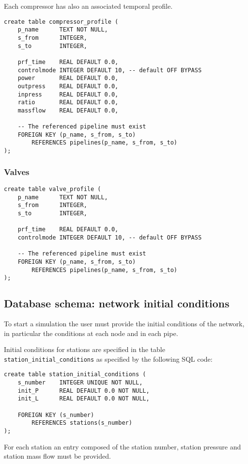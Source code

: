 Each compressor has also an associated temporal profile.
\begin{verbatim}
create table compressor_profile (
    p_name      TEXT NOT NULL,
    s_from      INTEGER,
    s_to        INTEGER,

    prf_time    REAL DEFAULT 0.0,
    controlmode INTEGER DEFAULT 10, -- default OFF BYPASS
    power       REAL DEFAULT 0.0,
    outpress    REAL DEFAULT 0.0,
    inpress     REAL DEFAULT 0.0,
    ratio       REAL DEFAULT 0.0,
    massflow    REAL DEFAULT 0.0,

    -- The referenced pipeline must exist
    FOREIGN KEY (p_name, s_from, s_to)
        REFERENCES pipelines(p_name, s_from, s_to)
);
\end{verbatim}


\subsubsection{Valves}
\begin{verbatim}
create table valve_profile (
    p_name      TEXT NOT NULL,
    s_from      INTEGER,
    s_to        INTEGER,

    prf_time    REAL DEFAULT 0.0,
    controlmode INTEGER DEFAULT 10, -- default OFF BYPASS

    -- The referenced pipeline must exist
    FOREIGN KEY (p_name, s_from, s_to)
        REFERENCES pipelines(p_name, s_from, s_to)
);
\end{verbatim}

\subsection{Database schema: network initial conditions}

To start a simulation the user must provide the initial conditions of the network,
in particular the conditions at each node and in each pipe.

Initial conditions for stations are specified in the table \texttt{station\_initial\_conditions}
as specified by the following SQL code:
\begin{verbatim}
create table station_initial_conditions (
    s_number    INTEGER UNIQUE NOT NULL,
    init_P      REAL DEFAULT 0.0 NOT NULL,
    init_L      REAL DEFAULT 0.0 NOT NULL,

    FOREIGN KEY (s_number)
        REFERENCES stations(s_number)
);
\end{verbatim}
For each station an entry composed of the station number, station pressure and
station mass flow must be provided.

